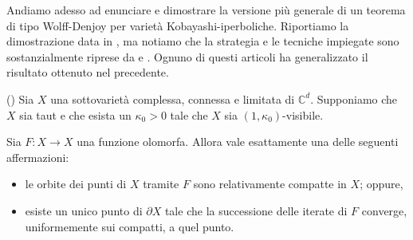Andiamo adesso ad enunciare e dimostrare la versione più generale di un teorema di tipo Wolff-Denjoy per varietà Kobayashi-iperboliche. Riportiamo la dimostrazione data in \cite{CMS}, ma notiamo che la strategia e le tecniche impiegate sono sostanzialmente riprese da \cite{BZ1} e \cite{BM}. Ognuno di questi articoli ha generalizzato il risultato ottenuto nel precedente.

\begin{thm} \label{wd_type}
    (\cite[Theorem 1.15]{CMS}) Sia $X$ una sottovarietà complessa, connessa e limitata di $\mathbb{C}^d$. Supponiamo che $X$ sia taut e che esista un $\kappa_0>0$ tale che $X$ sia $(1,\kappa_0)$-visibile.
    
    Sia $F:X \longrightarrow X$ una funzione olomorfa. Allora vale esattamente una delle seguenti affermazioni:
    \begin{itemize}
        \item le orbite dei punti di $X$ tramite $F$ sono relativamente compatte in $X$; oppure,
        \item esiste un unico punto di $\partial X$ tale che la successione delle iterate di $F$ converge, uniformemente sui compatti, a quel punto.
    \end{itemize}
\end{thm}

